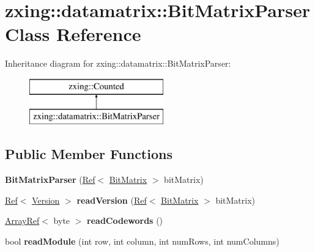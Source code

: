\hypertarget{classzxing_1_1datamatrix_1_1_bit_matrix_parser}{}\section{zxing\+:\+:datamatrix\+:\+:Bit\+Matrix\+Parser Class Reference}
\label{classzxing_1_1datamatrix_1_1_bit_matrix_parser}
Inheritance diagram for zxing\+:\+:datamatrix\+:\+:Bit\+Matrix\+Parser\+:\begin{figure}[H]
\begin{center}
\leavevmode
\includegraphics[height=2.000000cm]{classzxing_1_1datamatrix_1_1_bit_matrix_parser}
\end{center}
\end{figure}
\subsection*{Public Member Functions}
\begin{DoxyCompactItemize}
\item 
\mbox{\label{classzxing_1_1datamatrix_1_1_bit_matrix_parser_a30ee93f0c6d7fcaddd6168ac0f7ed5dc}} 
{\bfseries Bit\+Matrix\+Parser} (\mbox{\hyperlink{classzxing_1_1_ref}{Ref}}$<$ \mbox{\hyperlink{classzxing_1_1_bit_matrix}{Bit\+Matrix}} $>$ bit\+Matrix)
\item 
\mbox{\label{classzxing_1_1datamatrix_1_1_bit_matrix_parser_a42c57547064d13e8e861ac46ce1fa040}} 
\mbox{\hyperlink{classzxing_1_1_ref}{Ref}}$<$ \mbox{\hyperlink{classzxing_1_1datamatrix_1_1_version}{Version}} $>$ {\bfseries read\+Version} (\mbox{\hyperlink{classzxing_1_1_ref}{Ref}}$<$ \mbox{\hyperlink{classzxing_1_1_bit_matrix}{Bit\+Matrix}} $>$ bit\+Matrix)
\item 
\mbox{\label{classzxing_1_1datamatrix_1_1_bit_matrix_parser_aece140f52fe1f651945cc618eee662f6}} 
\mbox{\hyperlink{classzxing_1_1_array_ref}{Array\+Ref}}$<$ byte $>$ {\bfseries read\+Codewords} ()
\item 
\mbox{\label{classzxing_1_1datamatrix_1_1_bit_matrix_parser_a45a3781e760ef8095cfe656c29c7984f}} 
bool {\bfseries read\+Module} (int row, int column, int num\+Rows, int num\+Columns)
\end{DoxyCompactItemize}


